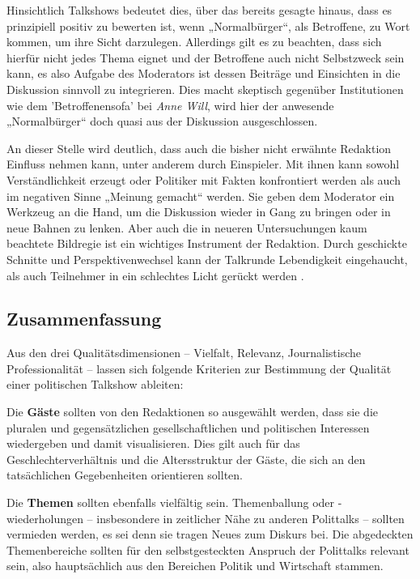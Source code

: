 Hinsichtlich Talkshows bedeutet dies, über das bereits gesagte hinaus, dass es prinzipiell positiv zu bewerten ist, wenn „Normalbürger“, als Betroffene, zu Wort kommen, um ihre Sicht darzulegen. Allerdings gilt es zu beachten, dass sich hierfür nicht jedes Thema eignet und der Betroffene auch nicht Selbstzweck sein kann, es also Aufgabe des Moderators ist dessen Beiträge und Einsichten in die Diskussion sinnvoll zu integrieren. Dies macht skeptisch gegenüber Institutionen wie dem 'Betroffenensofa' bei \textit{Anne Will}, wird hier der anwesende „Normalbürger“ doch quasi aus der Diskussion ausgeschlossen.

An dieser Stelle wird deutlich, dass auch die bisher nicht erwähnte Redaktion Einfluss nehmen kann, unter anderem durch Einspieler. Mit ihnen kann sowohl Verständlichkeit erzeugt oder Politiker mit Fakten konfrontiert werden als auch im negativen Sinne „Meinung gemacht“ werden. Sie geben dem Moderator ein Werkzeug an die Hand, um die Diskussion wieder in Gang zu bringen oder in neue Bahnen zu lenken. Aber auch die in neueren Untersuchungen kaum beachtete Bildregie ist ein wichtiges Instrument der Redaktion. Durch geschickte Schnitte und Perspektivenwechsel kann der Talkrunde Lebendigkeit eingehaucht, als auch Teilnehmer in ein schlechtes Licht gerückt werden \parencite[107]{mahloZurDiskussionUm1956}.

\subsection{Zusammenfassung}

Aus den drei Qualitätsdimensionen – Vielfalt, Relevanz, Journalistische Professionalität – lassen sich folgende Kriterien zur Bestimmung der Qualität einer politischen Talkshow ableiten:

Die \textbf{Gäste} sollten von den Redaktionen so ausgewählt werden, dass sie die pluralen und gegensätzlichen gesellschaftlichen und politischen Interessen wiedergeben und damit visualisieren. Dies gilt auch für das Geschlechterverhältnis und die Altersstruktur der Gäste, die sich an den tatsächlichen Gegebenheiten orientieren sollten.

Die \textbf{Themen} sollten ebenfalls vielfältig sein. Themenballung oder -wiederholungen – insbesondere in zeitlicher Nähe zu anderen Polittalks – sollten vermieden werden, es sei denn sie tragen Neues zum Diskurs bei. Die abgedeckten Themenbereiche sollten für den selbstgesteckten Anspruch der Polittalks relevant sein, also hauptsächlich aus den Bereichen Politik und Wirtschaft stammen.

